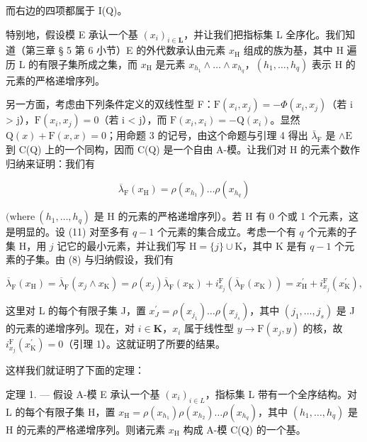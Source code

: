   而右边的四项都属于 I(Q)。

  特别地，假设模 E 承认一个基 \((x_{i})_{i\in \mathbf{L}}\)，并让我们把指标集 L 全序化。我们知道（第三章 § 5 第 6 小节）E 的外代数承认由元素 \(x_{\mathrm{H}}\) 组成的族为基，其中 H 遍历 L 的有限子集所成之集，而 \(x_{\mathrm{H}}\) 是元素 \(x_{h_1}\wedge \ldots \wedge x_{h_q}\)，\((h_1,\ldots ,h_q)\) 表示 H 的元素的严格递增序列。

  另一方面，考虑由下列条件定义的双线性型 F：\(\mathrm{F}(x_{i}, x_{j}) = -\Phi(x_{i}, x_{j})\)（若 i \textgreater{} j），\(\mathrm{F}(x_{i}, x_{j}) = 0\)（若 i \textless{} j），而 \(\mathrm{F}(x_{i}, x_{i}) = -\mathrm{Q}(x_{i})\)。显然 \(\mathrm{Q}(x) + \mathrm{F}(x, x) = 0\)；用命题 3 的记号，由这个命题与引理 4 得出 \(\bar{\lambda}_{\mathrm{F}}\) 是 \(\wedge \mathrm{E}\) 到 C(Q) 上的一个同构，因而 C(Q) 是一个自由 A-模。让我们对 H 的元素个数作归纳来证明：我们有

\[
\overline {{{{\lambda}}}} _ {\mathrm{F}} (x _ {\mathrm{H}}) = \rho (x _ {h _ {1}}) \dots \rho (x _ {h _ {q}})\tag{11}
\]

\((\mathrm{where}\ (h_{1},\ldots,h_{q})\) 是 H 的元素的严格递增序列）。若 H 有 0 个或 1 个元素，这是明显的。设 (11) 对至多有 \(q-1\) 个元素的集合成立。考虑一个有 \(q\) 个元素的子集 H，用 \(j\) 记它的最小元素，并让我们写 \(\mathrm{H}=\{j\}\cup\mathrm{K}\)，其中 K 是有 \(q-1\) 个元素的子集。由 (8) 与归纳假设，我们有

\[
\overline {{{\lambda}}} _ {\mathrm{F}} (x _ {\mathrm{H}}) = \overline {{{\lambda}}} _ {\mathrm{F}} (x _ {j} \wedge x _ {\mathrm{K}}) = \rho (x _ {j}) \overline {{{\lambda}}} _ {\mathrm{F}} (x _ {\mathrm{K}}) + i _ {x _ {j}} ^ {\mathrm{F}} (\overline {{{\lambda}}} _ {\mathrm{F}} (x _ {\mathrm{K}})) = x _ {\mathrm{H}} ^ {\prime} + i _ {x _ {j}} ^ {\mathrm{F}} (x _ {\mathrm{K}} ^ {\prime}),
\]

这里对 L 的每个有限子集 J，置 \(x_{J}^{\prime}=\rho(x_{j_{1}})\ldots\rho(x_{j_{s}})\)，其中 \((j_{1},\ldots,j_{s})\) 是 J 的元素的递增序列。现在，对 \(i\in\mathbf{K}\)，\(x_{i}\) 属于线性型 \(y\to\mathrm{F}(x_{j},y)\) 的核，故 \(i_{x_{j}}^{\mathrm{F}}(x_{\mathrm{K}}^{\prime})=0\)（引理 1）。这就证明了所要的结果。

  这样我们就证明了下面的定理：

定理 1. --- 假设 A-模 E 承认一个基 \((x_{i})_{i\in L}\)，指标集 L 带有一个全序结构。对 L 的每个有限子集 H，置 \(x_{\mathrm{H}} = \rho(x_{h_1})\rho(x_{h_2})\ldots \rho(x_{h_q})\)，其中 \((h_1,\ldots,h_q)\) 是 H 的元素的严格递增序列。则诸元素 \(x_{\mathrm{H}}\) 构成 A-模 C(Q) 的一个基。

